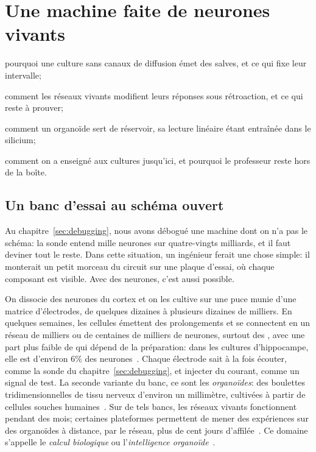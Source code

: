 \chapter{Une machine faite de neurones vivants}
\label{sec:livingmachine}
\begin{chaptergoals}
\item pourquoi une culture sans canaux de diffusion émet des salves, et ce qui fixe leur intervalle;
\item comment les réseaux vivants modifient leurs réponses sous rétroaction, et ce qui reste à prouver;
\item comment un organoïde sert de réservoir, sa lecture linéaire étant entraînée dans le silicium;
\item comment on a enseigné aux cultures jusqu'ici, et pourquoi le professeur reste hors de la boîte.
\end{chaptergoals}

\section{Un banc d'essai au schéma ouvert}

Au chapitre~\ref{sec:debugging}, nous avons débogué une machine dont on n'a pas le schéma: la sonde entend mille neurones sur quatre-vingts milliards, et il faut deviner tout le reste. Dans cette situation, un ingénieur ferait une chose simple: il monterait un petit morceau du circuit sur une plaque d'essai, où chaque composant est visible. Avec des neurones, c'est aussi possible.

On dissocie des neurones du cortex et on les cultive sur une puce munie d'une matrice d'électrodes, de quelques dizaines à plusieurs dizaines de milliers. En quelques semaines, les cellules émettent des prolongements et se connectent en un réseau de milliers ou de centaines de milliers de neurones, surtout des , avec une part plus faible de  qui dépend de la préparation: dans les cultures d'hippocampe, elle est d'environ $6\%$ des neurones~\cite{Benson1994}. Chaque électrode sait à la fois écouter, comme la sonde du chapitre~\ref{sec:debugging}, et injecter du courant, comme un signal de test. La seconde variante du banc, ce sont les \emph{organoïdes}: des boulettes tridimensionnelles de tissu nerveux d'environ un millimètre, cultivées à partir de cellules souches humaines~\cite{Lancaster2013}. Sur de tels bancs, les réseaux vivants fonctionnent pendant des mois; certaines plateformes permettent de mener des expériences sur des organoïdes à distance, par le réseau, plus de cent jours d'affilée~\cite{Jordan2024}. Ce domaine s'appelle le \emph{calcul biologique} ou l'\emph{intelligence organoïde}~\cite{Smirnova2023}.

